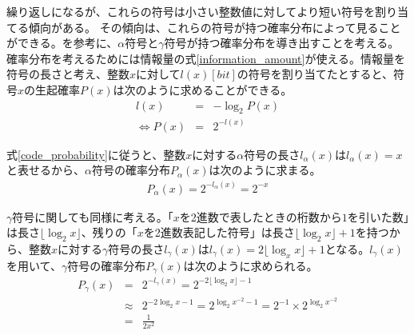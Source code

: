 \documentclass[uplatex,dvipdfmx,b5j,10pt]{jsbook}
\theoremstyle{definition}
\begin{document}
繰り返しになるが、これらの符号は小さい整数値に対してより短い符号を割り当てる傾向がある。
その傾向は、これらの符号が持つ確率分布によって見ることができる。\cite{gammaprobdist}を参考に、$\alpha$符号と$\gamma$符号が持つ確率分布を導き出すことを考える。確率分布を考えるためには情報量の式\ref{information_amount}が使える。情報量を符号の長さと考え、整数$x$に対して$l(x)[bit]$の符号を割り当てたとすると、符号$x$の生起確率$P(x)$は次のように求めることができる。
\begin{eqnarray}
  l(x) &=& -\log_{2}P(x)  \nonumber \\
  \iff P(x) &=& 2^{-l(x)} \label{code_probability}
\end{eqnarray}

式\ref{code_probability}に従うと、整数$x$に対する$\alpha$符号の長さ$l_{\alpha}(x)$は$l_{\alpha}(x) = x$と表せるから、$\alpha$符号の確率分布$P_{\alpha}(x)$は次のように求まる。
\begin{eqnarray}
  P_{\alpha}(x) = 2^{-l_{\alpha}(x)} = 2^{-x} \label{alpha_code_probability}
\end{eqnarray}

$\gamma$符号に関しても同様に考える。「$x$を2進数で表したときの桁数から$1$を引いた数」は長さ$\lfloor \log_{2} x \rfloor$、残りの「$x$を2進数表記した符号」は長さ$\lfloor \log_{2} x \rfloor + 1$を持つから、整数$x$に対する$\gamma$符号の長さ$l_{\gamma}(x)$は$l_{\gamma}(x) = 2\lfloor \log_{x} x \rfloor + 1$となる。$l_{\gamma}(x)$を用いて、$\gamma$符号の確率分布$P_{\gamma}(x)$は次のように求められる。
\begin{eqnarray}
  P_{\gamma}(x) &=& 2^{-l_{\gamma}(x)} = 2^{-2\lfloor \log_{2} x \rfloor - 1} \nonumber \\
  &\approx& 2^{-2 \log_{2} x - 1} = 2^{\log_{2} x^{-2} - 1} = 2^{-1} \times 2^{\log_{2} x^{-2}} \nonumber \\
  &=& \frac{1}{2x^{2}} \label{gamma_code_probability}
\end{eqnarray}
\end{document}
